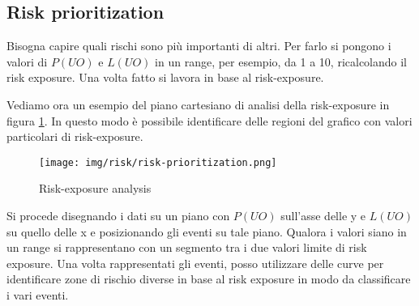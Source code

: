\subsection{Risk prioritization}
Bisogna capire quali rischi sono più importanti di altri. Per farlo si pongono i
valori di $P(UO)$ e $L(UO)$ in un range, per esempio, da 1 a 10, ricalcolando il
risk exposure. Una volta fatto si lavora in base al risk-exposure.
\begin{esempio}
    Vediamo ora un esempio del piano cartesiano di analisi della risk-exposure in
    figura \ref{fig:risk-exposure-analysis}. In questo modo è possibile identificare
    delle regioni del grafico con valori particolari di risk-exposure.
    \begin{figure}[!ht]
        \centering
        \texttt{[image: img/risk/risk-prioritization.png]}
        \caption{Risk-exposure analysis}
        \label{fig:risk-exposure-analysis}
    \end{figure}
\end{esempio}
Si procede disegnando i dati su un piano con $P(UO)$ sull'asse delle y e $L(UO)$
su quello delle x e posizionando gli eventi su tale piano. Qualora i valori siano
in un range si rappresentano con un segmento tra i due valori limite di risk
exposure. Una volta rappresentati gli eventi, posso utilizzare delle curve per
identificare zone di rischio diverse in base al risk exposure in modo da
classificare i vari eventi.
